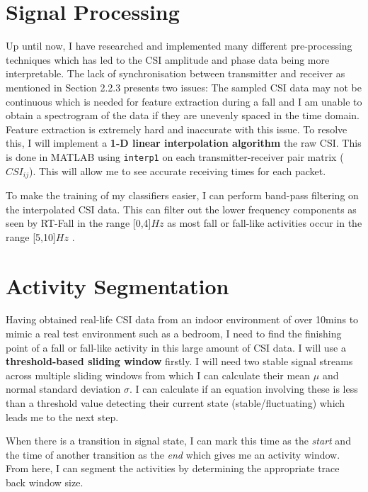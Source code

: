 \section{Signal Processing}
Up until now, I have researched and implemented many different pre-processing techniques which has led to the CSI amplitude and phase data being more interpretable. The lack of synchronisation between transmitter and receiver as mentioned in Section 2.2.3 presents two issues: The sampled CSI data may not be continuous which is needed for feature extraction during a fall and I am unable to obtain a spectrogram of the data if they are unevenly spaced in the time domain. Feature extraction is extremely hard and inaccurate with this issue. To resolve this, I will implement a \textbf{ 1-D linear interpolation algorithm} the raw CSI. This is done in MATLAB using \lstinline{interp1} on each transmitter-receiver pair matrix ($CSI_{ij}$). This will allow me to see accurate receiving times for each packet.\par
To make the training of my classifiers easier, I can perform band-pass filtering on the interpolated CSI data. This can filter out the lower frequency components as seen by RT-Fall in the range [0,4]$Hz$ as most fall or fall-like activities occur in the range [5,10]$Hz$ \citep{RTFall}.
\section{Activity Segmentation}
Having obtained real-life CSI data from an indoor environment of over 10mins to mimic a real test environment such as a bedroom, I need to find the finishing point of a fall or fall-like activity in this large amount of CSI data. I will use a \textbf{threshold-based sliding window} firstly. I will need two stable signal streams across multiple sliding windows from which I can calculate their mean $\mu$ and normal standard deviation $\sigma$. I can calculate if an equation involving these is less than a threshold value detecting their current state (stable/fluctuating) which leads me to the next step. \par
When there is a transition in signal state, I can mark this time as the \textit{start} and the time of another transition as the \textit{end} which gives me an activity window. From here, I can segment the activities by determining the appropriate trace back window size. 
